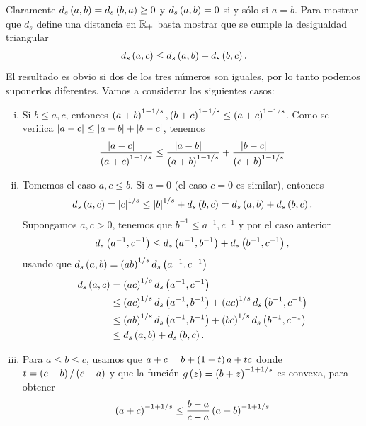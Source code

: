 \begin{dem}
	Claramente $d_{s}\left( a,b \right) = d_{s}\left( b,a \right) \ge 0$ y $d_{s}\left( a,b \right) = 0$ si y sólo si $a = b$.
	Para mostrar que $d_{s}$ define una distancia en $\mathbb{R}_{+}$ basta mostrar que se cumple la desigualdad triangular
	\begin{align*}
	d_{s}\left( a,c \right) \le d_{s}\left( a,b \right) + d_{s}\left( b,c \right).
	\end{align*}
	El resultado es obvio si dos de los tres números son iguales, por lo tanto podemos suponerlos diferentes. Vamos a considerar los siguientes casos:
	\begin{enumerate}[i)]
		\item Si $b \le a,c$, entonces $\left( a + b \right)^{1-1/s},\left( b + c \right)^{1-1/s} \le \left( a + c \right)^{1-1/s}$.
		Como se verifica $\left| a-c \right| \le \left| a-b \right| + \left| b-c \right|$, tenemos
		\begin{align*}
		\dfrac{\left| a - c \right|\ \ \ }{\left( a + c \right)^{1-1/s}} \le \dfrac{\left| a - b \right|\ \ \ }{\left( a + b \right)^{1-1/s}} 
		+ \dfrac{\left| b - c \right|\ \ \ }{\left( c + b \right)^{1-1/s}}
		\end{align*}
		\item Tomemos el caso $a,c \le b$. Si $a=0$ (el caso $c=0$ es similar), entonces 
		\begin{align*}
		d_{s}\left( a,c \right) = \left| c \right|^{1/s} \le \left| b \right|^{1/s} + d_{s}\left( b,c \right) = d_{s}\left( a,b \right) + d_{s}\left( b,c \right).
		\end{align*}
		Supongamos $a,c>0$, tenemos que $b^{-1} \le a^{-1},c^{-1}$ y por el caso anterior
		\begin{align*}
		d_{s}\left( a^{-1},c^{-1} \right) \le d_{s}\left( a^{-1},b^{-1} \right) + d_{s}\left( b^{-1},c^{-1} \right),
		\end{align*}
		usando que $d_{s}\left( a,b \right) = \left( a b \right)^{1/s}d_{s}\left( a^{-1},c^{-1} \right)$
		\begin{align*}
		d_{s}\left( a,c \right) & = \left( a c \right)^{1/s} d_{s}\left( a^{-1},c^{-1} \right) \\
		& \le \left( a c \right)^{1/s} d_{s}\left( a^{-1},b^{-1} \right) + \left( a c \right)^{1/s} d_{s}\left( b^{-1},c^{-1} \right) \\
		& \le \left( a b \right)^{1/s} d_{s}\left( a^{-1},b^{-1} \right) + \left( b c \right)^{1/s} d_{s}\left( b^{-1},c^{-1} \right) \\
		& \le d_{s}\left( a,b \right) + d_{s}\left( b,c \right).
		\end{align*}
		\item Para $a \le b \le c$, usamos que $a + c = b + \left( 1-t \right) a + t c$
		donde $t = \left( c-b \right)/\left( c-a \right)$ y que la función $g\left( z \right) = \left( b+z \right)^{-1+1/s}$ es convexa, para obtener
		\begin{align*}
		\pa{a+c}^{-1+1/s} \le \frac{b-a}{c-a} \pa{a+b}^{-1+1/s}

\end{align*}
\end{enumerate}
\end{dem}
